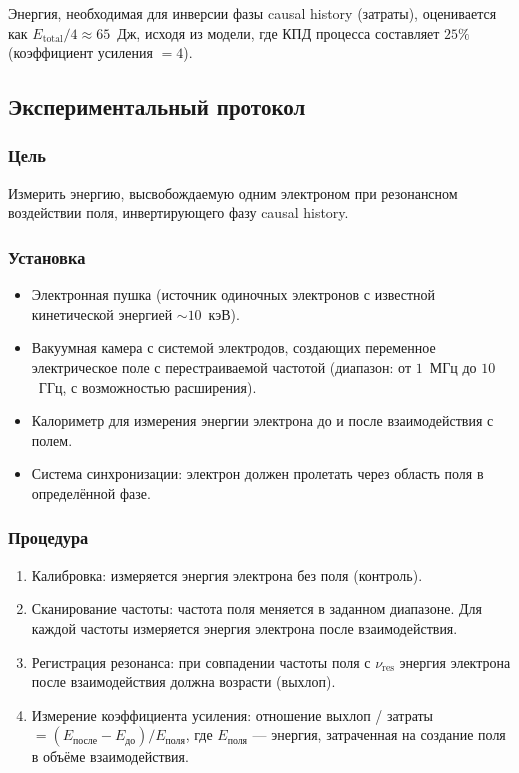 \documentclass[12pt,a4paper]{article}
\begin{document}
Энергия, необходимая для инверсии фазы causal history (затраты), оценивается как $E_{\text{total}} / 4 \approx 65$~Дж, исходя из модели, где КПД процесса составляет $25\%$ (коэффициент усиления $= 4$).

\subsection{Экспериментальный протокол}

\subsubsection{Цель}
Измерить энергию, высвобождаемую одним электроном при резонансном воздействии поля, инвертирующего фазу causal history.

\subsubsection{Установка}
\begin{itemize}
    \item Электронная пушка (источник одиночных электронов с известной кинетической энергией $\sim 10$~кэВ).
    \item Вакуумная камера с системой электродов, создающих переменное электрическое поле с перестраиваемой частотой (диапазон: от $1$~МГц до $10$~ГГц, с возможностью расширения).
    \item Калориметр для измерения энергии электрона до и после взаимодействия с полем.
    \item Система синхронизации: электрон должен пролетать через область поля в определённой фазе.
\end{itemize}

\subsubsection{Процедура}
\begin{enumerate}[label=\arabic*.]
    \item Калибровка: измеряется энергия электрона без поля (контроль).
    \item Сканирование частоты: частота поля меняется в заданном диапазоне. Для каждой частоты измеряется энергия электрона после взаимодействия.
    \item Регистрация резонанса: при совпадении частоты поля с $\nu_{\text{res}}$ энергия электрона после взаимодействия должна возрасти (выхлоп).
    \item Измерение коэффициента усиления: отношение выхлоп / затраты $= (E_{\text{после}} - E_{\text{до}}) / E_{\text{поля}}$, где $E_{\text{поля}}$ --- энергия, затраченная на создание поля в объёме взаимодействия.
\end{enumerate}
\end{document}

